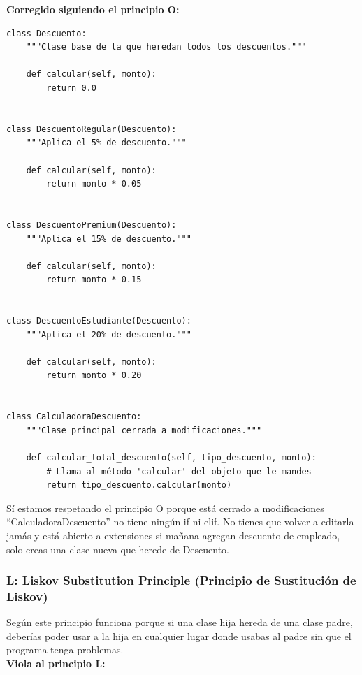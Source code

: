\documentclass{article}
\begin{document}
				\textbf{Corregido siguiendo el principio O:}
       			\begin{verbatim}
class Descuento:
    """Clase base de la que heredan todos los descuentos."""

    def calcular(self, monto):
        return 0.0


class DescuentoRegular(Descuento):
    """Aplica el 5% de descuento."""

    def calcular(self, monto):
        return monto * 0.05


class DescuentoPremium(Descuento):
    """Aplica el 15% de descuento."""

    def calcular(self, monto):
        return monto * 0.15


class DescuentoEstudiante(Descuento):
    """Aplica el 20% de descuento."""

    def calcular(self, monto):
        return monto * 0.20


class CalculadoraDescuento:
    """Clase principal cerrada a modificaciones."""

    def calcular_total_descuento(self, tipo_descuento, monto):
        # Llama al método 'calcular' del objeto que le mandes
        return tipo_descuento.calcular(monto)
        		\end{verbatim}
        			Sí estamos respetando el principio O porque está cerrado a modificaciones “CalculadoraDescuento” no tiene ningún if ni elif. No tienes que volver a editarla jamás y está abierto a extensiones si mañana agregan descuento de empleado, solo creas una clase nueva que herede de Descuento.
    \newpage
       			
    		\subsubsection*{L: Liskov Substitution Principle (Principio de Sustitución de Liskov)}
        		Según este principio funciona porque si una clase hija hereda de una clase padre, deberías poder usar
				a la hija en cualquier lugar donde usabas al padre sin que el programa tenga problemas.\\ 

        		\textbf{Viola al principio L:}
\end{document}
